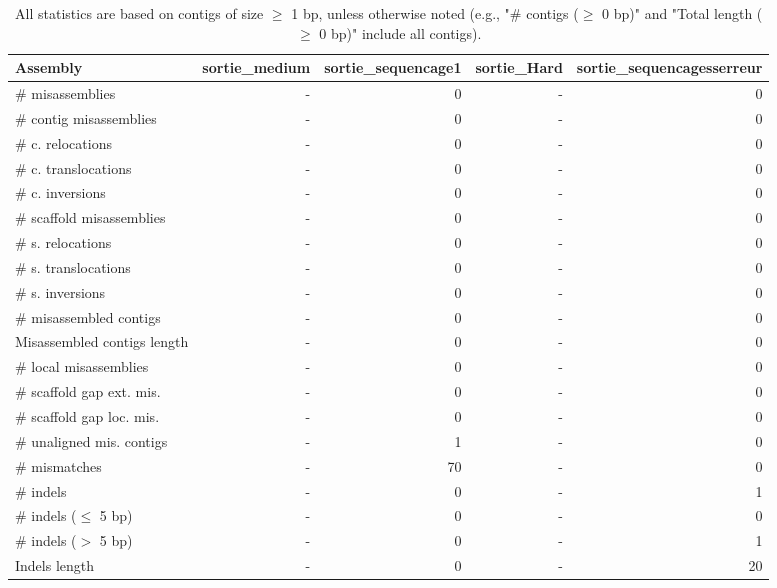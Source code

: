 \documentclass[12pt,a4paper]{article}
\begin{document}
\begin{table}[ht]
\begin{center}
\caption{All statistics are based on contigs of size $\geq$ 1 bp, unless otherwise noted (e.g., "\# contigs ($\geq$ 0 bp)" and "Total length ($\geq$ 0 bp)" include all contigs).}
\begin{tabular}{|l*{4}{|r}|}
\hline
Assembly & sortie\_medium & sortie\_sequencage1 & sortie\_Hard & sortie\_sequencagesserreur \\ \hline
\# misassemblies & - & 0 & - & 0 \\ \hline
\hspace{2mm}\# contig misassemblies & - & 0 & - & 0 \\ \hline
\hspace{5mm}\# c. relocations & - & 0 & - & 0 \\ \hline
\hspace{5mm}\# c. translocations & - & 0 & - & 0 \\ \hline
\hspace{5mm}\# c. inversions & - & 0 & - & 0 \\ \hline
\hspace{2mm}\# scaffold misassemblies & - & 0 & - & 0 \\ \hline
\hspace{5mm}\# s. relocations & - & 0 & - & 0 \\ \hline
\hspace{5mm}\# s. translocations & - & 0 & - & 0 \\ \hline
\hspace{5mm}\# s. inversions & - & 0 & - & 0 \\ \hline
\# misassembled contigs & - & 0 & - & 0 \\ \hline
Misassembled contigs length & - & 0 & - & 0 \\ \hline
\# local misassemblies & - & 0 & - & 0 \\ \hline
\# scaffold gap ext. mis. & - & 0 & - & 0 \\ \hline
\# scaffold gap loc. mis. & - & 0 & - & 0 \\ \hline
\# unaligned mis. contigs & - & 1 & - & 0 \\ \hline
\# mismatches & - & 70 & - & 0 \\ \hline
\# indels & - & 0 & - & 1 \\ \hline
\hspace{5mm}\# indels ($\leq$ 5 bp) & - & 0 & - & 0 \\ \hline
\hspace{5mm}\# indels ($>$ 5 bp) & - & 0 & - & 1 \\ \hline
Indels length & - & 0 & - & 20 \\ \hline
\end{tabular}
\end{center}
\end{table}
\end{document}
